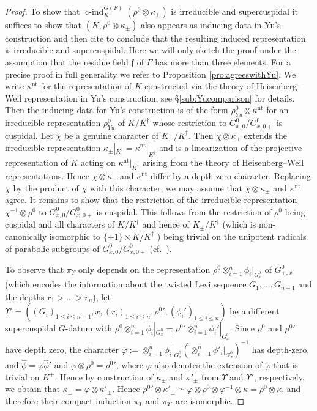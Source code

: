 \documentclass{article}
\def\hat{\widehat}
\DeclareMathOperator{\cind}{c-ind}
\theoremstyle{definition}
\numberwithin{equation}{subsection}
\renewcommand{\-}{\hyp{}}
\newcommand{\rf}{\mathfrak{f}}
\begin{document}
\begin{proof}
	To show that $\cind_K^{G(F)}(\rho^0 \otimes \kappa_{\pm})$ is irreducible and supercuspidal it suffices to show that $(K, \rho^0 \otimes \kappa_{\pm})$ also appears as inducing data in Yu's construction and then cite \cite{Fin21Comp, Yu01} to conclude that the resulting induced representation is irreducible and supercuspidal.
	Here we will only sketch the proof under the assumption that the residue field $\rf$ of $F$ has more than three elements. For a precise proof in full generality we refer to Proposition \ref{pro:agreeswithYu}.
	 We write $\kappa^{\mathrm{nt}}$ for the representation of $K$ constructed via the theory of Heisenberg--Weil representation in Yu's construction, see \S\ref{sub:Yucomparison} for details. Then the inducing data for Yu's construction is of the form $\rho^0_{Yu} \otimes \kappa^{\mathrm{nt}}$ for an irreducible representation $\rho^0_{Yu}$ of $K/K^\dagger$ whose restriction to $G^0_{x,0}/G^0_{x,0+}$ is cuspidal.
	Let $\chi$ be a genuine character of $K_{\pm}/K^\dagger$. Then $\chi \otimes \kappa_{\pm}$ extends the irreducible representation $\kappa_{\pm}|_{K^\dagger}=\kappa^{\mathrm{nt}}|_{K^\dagger}$ and is a linearization of the projective representation of $K$ acting on $\kappa^{\mathrm{nt}}|_{K^\dagger}$ arising from the theory of Heisenberg--Weil representations. Hence  $\chi \otimes \kappa_{\pm}$ and $\kappa^{\mathrm{nt}}$ differ by a depth-zero character. Replacing $\chi$ by the product of $\chi$ with this character, we may assume that $\chi \otimes \kappa_{\pm}$ and $\kappa^{\mathrm{nt}}$ agree. It remains to show that the restriction of the irreducible representation $\chi^{-1} \otimes \rho^0$ to  $G^0_{x,0}/G^0_{x,0+}$ is cuspidal. This follows from the restriction of $\rho^0$ being cuspidal and all characters of $K/K^\dagger$ and hence of $K_{\pm}/K^\dagger$ (which is non-canonically isomorphic to $\{\pm 1\} \times K/K^\dagger$
) being trivial on the unipotent radicals of parabolic subgroups of $G^0_{x,0}/G^0_{x,0+}$ (cf.\ \cite[Theorem~C.1]{FS25}).
	
	To observe that $\pi_{\Upsilon}$ only depends on the representation $\rho^0 \otimes_{i=1}^n \phi_i|_{G^0_x}$ of $G^0_{\pm, x}$ (which encodes the information about the twisted Levi sequence $G_1, \hdots, G_{n+1}$ and the depths $r_1> \hdots >r_n$), let $\Upsilon'= ((G_i)_{1\leq i\leq n+1},x,(r_i)_{1\leq i\leq n},{\rho^0}',(\phi_i')_{1\leq i\leq n})$ be a different supercuspidal $G$-datum with $\rho^0 \otimes_{i=1}^n \phi_i|_{G^0_x}={\rho^0}' \otimes_{i=1}^n \phi_i'|_{G^0_x}$. Since $\rho^0$ and ${\rho^0}'$ have depth zero, the character $\varphi:=\otimes_{i=1}^n \phi_i|_{G^0_x}(\otimes_{i=1}^n\phi'_i|_{G^0_x})^{-1}$ has depth-zero, and $\hat \phi = \varphi \hat \phi'$ and $\varphi \otimes \rho^0 = {\rho^0}'$, where $\varphi$ also denotes the extension of $\varphi$ that is trivial on $K^+$. Hence by construction of $\kappa_{\pm}$ and $\kappa'_{\pm}$ from $\Upsilon$ and $\Upsilon'$, respectively, we obtain that $\kappa_{\pm}=\varphi \otimes \kappa'_{\pm}$. Hence ${\rho^0}'\otimes \kappa'_{\pm} \simeq \varphi \otimes \rho^0 \otimes \varphi^{-1} \otimes \kappa= \rho^0 \otimes \kappa$, and therefore their compact induction $\pi_{\Upsilon}$ and $\pi_{\Upsilon'}$ are isomorphic.
\end{proof}
\end{document}

